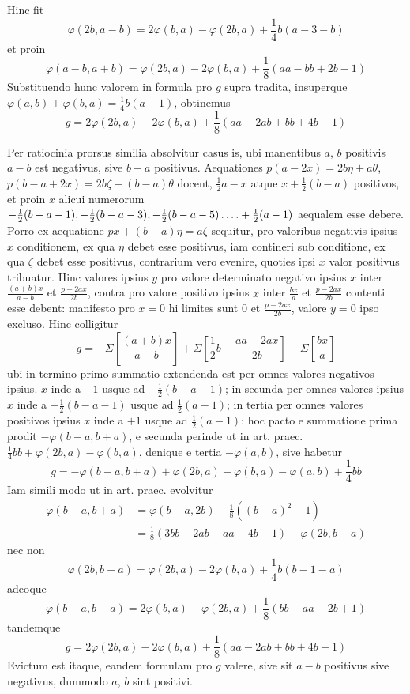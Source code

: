 %
Hinc fit
\[
\varphi(2b,a-b)=2\varphi(b,a)-\varphi(2b,a)+\frac14b(a-3-b)
\]
et proin
\[
\varphi(a-b,a+b)=\varphi(2b,a)-2\varphi(b,a)+\frac18(aa-bb+2b-1)
\]
Substituendo hunc valorem in formula pro $g$ supra tradita, insuperque $\varphi(a,b)+\varphi(b,a)=\frac14b(a-1)$, obtinemus
\[
g=2\varphi(2b,a)-2\varphi(b,a)+\frac18(aa-2ab+bb+4b-1)
\]

Per ratiocinia prorsus similia absolvitur casus is, ubi manentibus $a$, $b$ positivis $a-b$ est negativus, sive $b-a$ positivus. Aequationes $p(a-2x)=2b\eta+a\theta$, $p(b-a+2x)=2b\zeta+(b-a)\theta$ docent, $\frac12a-x$ atque $x+\frac12(b-a)$ positivos, et proin $x$ alicui numerorum $-\frac12(b-a-1),-\frac12(b-a-3),-\frac12(b-a-5)\mathinner{.\,.\,.\,.}+\frac12(a-1)$ aequalem esse debere. Porro ex aequatione $px+(b-a)\eta=a\zeta$ sequitur, pro valoribus negativis ipsius $x$ conditionem, ex qua $\eta$ debet esse positivus, iam contineri sub conditione, ex qua $\zeta$ debet esse positivus, contrarium vero evenire, quoties ipsi $x$ valor positivus tribuatur. Hinc valores ipsius $y$ pro valore determinato negativo ipsius $x$ inter $\frac{(a+b)x}{a-b}$ et $\frac{p-2ax}{2b}$, contra pro valore positivo ipsius $x$ inter $\frac{bx}{a}$ et $\frac{p-2ax}{2b}$ contenti esse debent: manifesto pro $x=0$ hi limites sunt $0$ et $\frac{p-2ax}{2b}$, valore $y=0$ ipso excluso. Hinc colligitur
\[
g=-\Sigma\left[\frac{(a+b)x}{a-b}\right]+\Sigma\left[\frac12b+\frac{aa-2ax}{2b}\right]-\Sigma\left[\frac{bx}{a}\right]
\]
ubi in termino primo summatio extendenda est per omnes valores negativos ipsius. $x$ inde a $-1$ usque ad $-\frac12(b-a-1)$; in secunda per omnes valores ipsius $x$ inde a $-\frac12(b-a-1)$ usque ad $\frac12(a-1)$; in tertia per omnes valores positivos ipsius $x$ inde a $+1$ usque ad $\frac12(a-1)$: hoc pacto e summatione prima prodit $-\varphi(b-a,b+a)$, e secunda perinde ut in art. praec. $\frac14bb+\varphi(2b,a)-\varphi(b,a)$, denique e tertia $-\varphi(a,b)$, sive habetur
\[
g=-\varphi(b-a,b+a)+\varphi(2b,a)-\varphi(b,a)-\varphi(a,b)+\frac14bb
\]
Iam simili modo ut in art. praec. evolvitur
%
\[
\begin{aligned}
\varphi(b-a,b+a)&=\varphi(b-a,2b)-\frac18((b-a)^2-1)\\
&=\frac18(3bb-2ab-aa-4b+1)-\varphi(2b,b-a)
\end{aligned}
\]
nec non
\[
\varphi(2b,b-a)=\varphi(2b,a)-2\varphi(b,a)+\frac14b(b-1-a)
\]
adeoque
\[
\varphi(b-a,b+a)=2\varphi(b,a)-\varphi(2b,a)+\frac18(bb-aa-2b+1)
\]
tandemque
\[
g=2\varphi(2b,a)-2\varphi(b,a)+\frac18(aa-2ab+bb+4b-1)
\]
Evictum est itaque, eandem formulam pro $g$ valere, sive sit $a-b$ positivus sive negativus, dummodo $a$, $b$ sint positivi.

